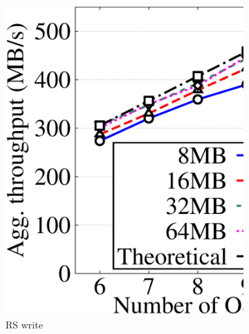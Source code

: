 \begin{figure}[!t]
\begin{subfigure}{0.48\linewidth}
     \includegraphics[width=\linewidth]{charts/transfer/eps/up/rs_6}
     \caption{RS write}
     \label{fig:rs_write}
 \end{subfigure}
 \begin{subfigure}{0.48\linewidth}

\end{subfigure}
\end{figure}
